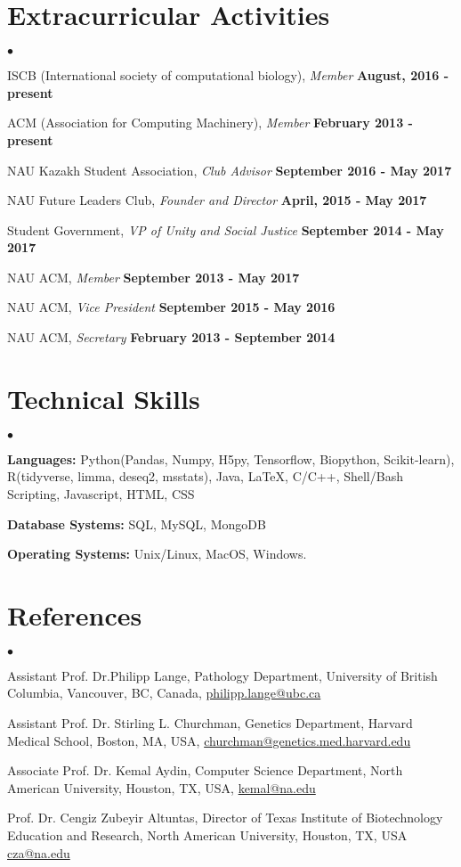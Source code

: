 \documentclass[margin,line]{res}
\newenvironment{list2}{
  \begin{list}{$\bullet$}{%
      \setlength{\itemsep}{0in}
      \setlength{\parsep}{0in} \setlength{\parskip}{0in}
      \setlength{\topsep}{0in} \setlength{\partopsep}{0in}
      \setlength{\leftmargin}{0.2in}}}{\end{list}}
\begin{document}
\begin{resume}
\section{\sc Extracurricular Activities}
\begin{list2}
\item ISCB (International society of computational biology), {\em Member} \hfill {\bf August, 2016 - present}
\item ACM (Association for Computing Machinery), {\em Member} \hfill  {\bf February 2013 - present}
\item NAU Kazakh Student Association, {\em Club Advisor} \hfill {\bf September 2016 - May 2017}
\item NAU Future Leaders Club, {\em Founder and Director} \hfill {\bf April, 2015 - May 2017}
\item Student Government, {\em VP of Unity and Social Justice} \hfill  {\bf September 2014 - May 2017}
\item NAU ACM, {\em Member} \hfill {\bf September 2013 - May 2017}
\item NAU ACM, {\em Vice President} \hfill  {\bf September 2015 - May 2016}
\item NAU ACM, {\em Secretary} \hfill  {\bf February 2013 - September 2014}
\end{list2}

\section{\sc Technical Skills}
\begin{list2}
\item {\bf Languages:}  Python(Pandas, Numpy, H5py, Tensorflow, Biopython, Scikit-learn), R(tidyverse, limma, deseq2, msstats), Java, \LaTeX, C/C++, Shell/Bash Scripting, Javascript, HTML, CSS
\item {\bf Database Systems:} SQL, MySQL, MongoDB
\item {\bf Operating Systems:}  Unix/Linux, MacOS, Windows.
\end{list2}

\section{\sc References}
\begin{list2}
\item Assistant Prof. Dr.Philipp Lange, Pathology Department, University of British Columbia, Vancouver, BC, Canada, \href{philipp.lange@ubc.ca}{philipp.lange@ubc.ca}
\item Assistant Prof. Dr. Stirling L. Churchman, Genetics Department, Harvard Medical School, Boston, MA, USA, \href{churchman@genetics.med.harvard.edu}{churchman@genetics.med.harvard.edu}
\item Associate Prof. Dr. Kemal Aydin, Computer Science Department, North American University, Houston, TX, USA, \href{kemal@na.edu}{kemal@na.edu}
\item Prof. Dr. Cengiz Zubeyir Altuntas, Director of Texas Institute of Biotechnology Education and Research, North American University, Houston, TX, USA \href{cza@na.edu}{cza@na.edu}
\end{list2}


\end{resume}
\end{document}
